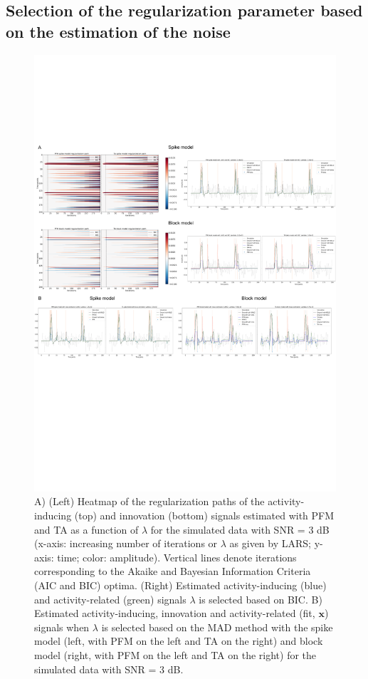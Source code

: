 \subsection{Selection of the regularization parameter based on the estimation of the noise}

\begin{figure}[t!]
    \begin{center}
        \includegraphics[width=\textwidth]{figures/figure_sim.pdf}
    \end{center}
    \caption{A) (Left) Heatmap of the regularization paths of the activity-inducing (top) and innovation (bottom) signals estimated with PFM and TA as a function of \(\lambda\) for the simulated data with SNR = 3 dB (x-axis: increasing number of iterations or \(\lambda\) as given by LARS; y-axis: time; color: amplitude). Vertical lines denote iterations corresponding to the Akaike and Bayesian Information Criteria (AIC and BIC) optima. (Right) Estimated activity-inducing (blue) and activity-related (green) signals \(\lambda\) is selected based on BIC. B) Estimated activity-inducing, innovation and activity-related (fit, \(\mathbf{x}\)) signals when \(\lambda\) is selected based on the MAD method with the spike model (left, with PFM on the left and TA on the right) and block model (right, with PFM on the left and TA on the right) for the simulated data with SNR = 3 dB.}
\label{fig:sim}
\end{figure}

